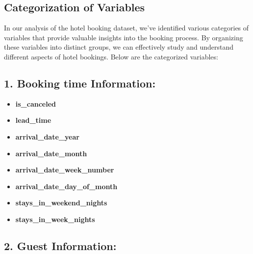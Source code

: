 \documentclass[11pt]{article}
\providecommand{\tightlist}{%
      \setlength{\itemsep}{0pt}\setlength{\parskip}{0pt}}
\begin{document}
    \hypertarget{categorization-of-variables}{%
\subsection{Categorization of
Variables}\label{categorization-of-variables}}

In our analysis of the hotel booking dataset, we've identified various
categories of variables that provide valuable insights into the booking
process. By organizing these variables into distinct groups, we can
effectively study and understand different aspects of hotel bookings.
Below are the categorized variables:

\hypertarget{booking-time-information}{%
\subsection{1. Booking time
Information:}\label{booking-time-information}}

\begin{itemize}
\tightlist
\item
  \textbf{is\_canceled}
\item
  \textbf{lead\_time}
\item
  \textbf{arrival\_date\_year}
\item
  \textbf{arrival\_date\_month}
\item
  \textbf{arrival\_date\_week\_number}
\item
  \textbf{arrival\_date\_day\_of\_month}
\item
  \textbf{stays\_in\_weekend\_nights}
\item
  \textbf{stays\_in\_week\_nights}
\end{itemize}

\hypertarget{guest-information}{%
\subsection{2. Guest Information:}\label{guest-information}}
\end{document}
